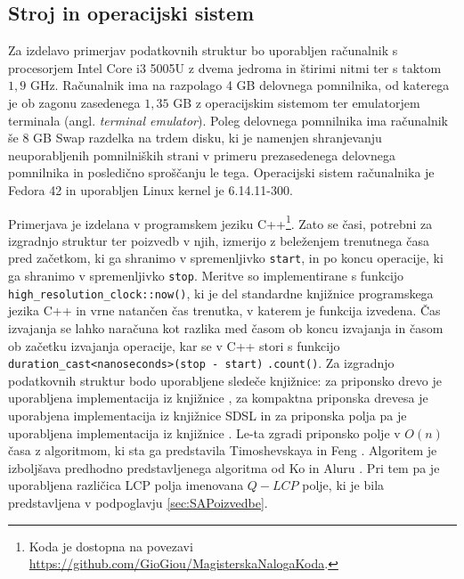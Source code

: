\subsection{Stroj in operacijski sistem}
Za izdelavo primerjav podatkovnih struktur bo uporabljen računalnik s procesorjem Intel Core i3 5005U z dvema jedroma in štirimi nitmi ter s taktom $1,9$ GHz. Računalnik ima na razpolago 4 GB delovnega pomnilnika, od katerega je ob zagonu zasedenega $1,35$ GB z operacijskim sistemom ter emulatorjem terminala (angl. \textit{terminal emulator}). Poleg delovnega pomnilnika ima računalnik še $8$ GB Swap razdelka na trdem disku, ki je namenjen shranjevanju neuporabljenih pomnilniških strani v primeru prezasedenega delovnega pomnilnika in posledično sproščanju le tega. Operacijski sistem računalnika je Fedora 42 in uporabljen Linux kernel je 6.14.11-300.

Primerjava je izdelana v programskem jeziku C++\footnote{Koda je dostopna na povezavi \url{https://github.com/GioGiou/MagisterskaNalogaKoda}.}. Zato se časi, potrebni za izgradnjo struktur ter poizvedb v njih, izmerijo z beleženjem trenutnega časa pred začetkom, ki ga shranimo v spremenljivko \verb|start|, in po koncu operacije, ki ga shranimo v spremenljivko \verb|stop|. Meritve so implementirane s funkcijo \verb|high_resolution_clock::now()|, ki je del standardne knjižnice programskega jezika C++ in vrne natančen čas trenutka, v katerem je funkcija izvedena. Čas izvajanja se lahko naračuna kot razlika med časom ob koncu izvajanja in časom ob začetku izvajanja operacije, kar se v C++ stori s funkcijo \verb|duration_cast<nanoseconds>(stop - start)| \verb|.count()|. Za izgradnjo podatkovnih struktur bodo uporabljene sledeče knjižnice: za priponsko drevo je uporabljena implementacija iz knjižnice \cite{ganeshk13}, za kompaktna priponska drevesa je uporabjena implementacija iz knjižnice SDSL \cite{gbmp2014sea} in za priponska polja pa je uporabljena implementacija iz knjižnice \cite{Grebnov2025}. Le-ta zgradi priponsko polje v $O(n)$ časa z algoritmom, ki sta ga predstavila Timoshevskaya in Feng \cite{Timoshevskaya2014}. Algoritem je izboljšava predhodno predstavljenega algoritma od Ko in Aluru \cite{Ko2005}. Pri tem pa je uporabljena različica LCP polja imenovana $Q-LCP$ polje, ki je bila predstavljena v podpoglavju \ref{sec:SAPoizvedbe}.

